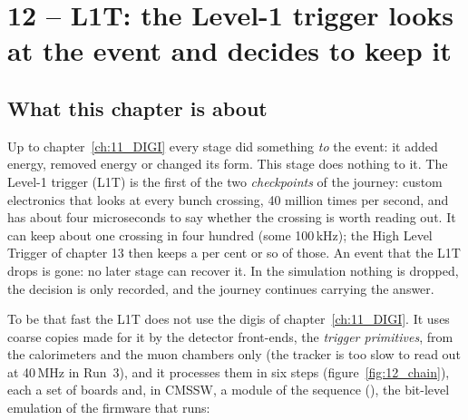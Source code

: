 
\chapter{12 -- L1T: the Level-1 trigger looks at the event and decides to keep it}
\label{ch:12_L1T}

\section{What this chapter is about}

Up to chapter~\ref{ch:11_DIGI} every stage did something \emph{to} the event: it added energy, removed energy or
changed its form. This stage does nothing to it. The Level-1 trigger (L1T) is the first of the two \emph{checkpoints}
of the journey: custom electronics that looks at every bunch crossing, 40 million times per second, and has about
four microseconds to say whether the crossing is worth reading out. It can keep about one crossing in four hundred
(some 100\,kHz); the High Level Trigger of chapter 13 then keeps a per cent or so of those. An event that the L1T
drops is gone: no later stage can recover it. In the simulation nothing is dropped, the decision is only recorded,
and the journey continues carrying the answer.

To be that fast the L1T does not use the digis of chapter~\ref{ch:11_DIGI}. It uses coarse copies made for it by
the detector front-ends, the \emph{trigger primitives}, from the calorimeters and the muon chambers only (the
tracker is too slow to read out at 40\,MHz in Run~3), and it processes them in six steps
(figure~\ref{fig:12_chain}), each a set of boards and, in CMSSW, a module of the sequence 
(), the bit-level emulation of the firmware that
 runs:

